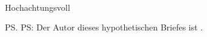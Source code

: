 \documentclass[12pt,ngerman,personal_settings,address_Hermann]{scrlttr2}
\begin{document}
\begin{letter}{\EmName\\ \EmAddress}
\Osehrgeehrte{\EmSex}{\EmVorname}



\closing{Hochachtungsvoll}
\ps{PS: Der Autor dieses hypothetischen Briefes ist \AUTHOR.}
\vfill
\printURLlong
\printlicense
\end{letter}
\end{document}
